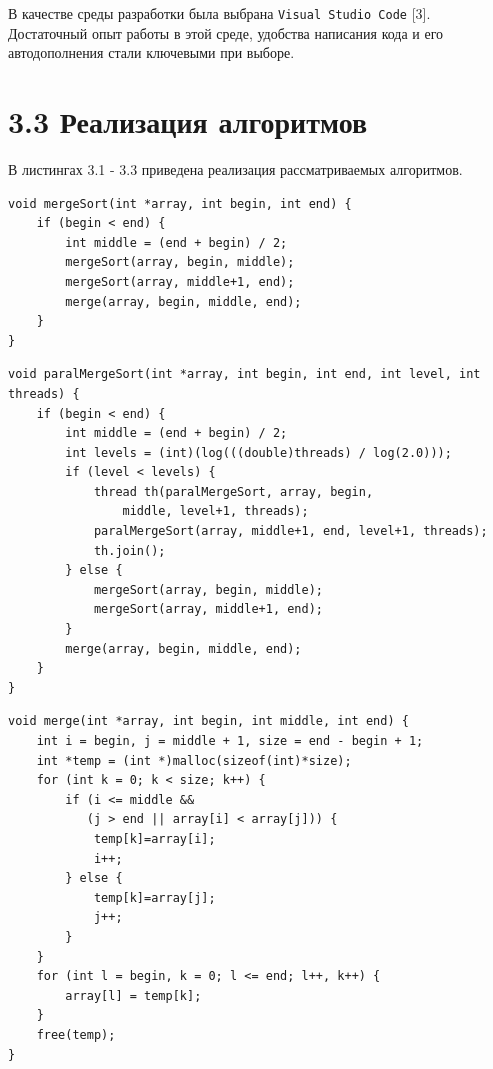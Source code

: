 \documentclass[12pt, a4paper]{report}
\begin{document}
В качестве среды разработки была выбрана \verb|Visual Studio Code| [3]. Достаточный опыт работы в этой среде, удобства написания кода и его автодополнения стали ключевыми при выборе.

\section*{3.3 Реализация алгоритмов}

В листингах 3.1 - 3.3 приведена реализация рассматриваемых алгоритмов.

\newpage
\begin{lstlisting}[title=Листинг 3.1~--- Стандартный алгоритм сортировки слиянием]
void mergeSort(int *array, int begin, int end) {
    if (begin < end) {
        int middle = (end + begin) / 2;
        mergeSort(array, begin, middle);
        mergeSort(array, middle+1, end);
        merge(array, begin, middle, end);
    }
}
\end{lstlisting}

\begin{lstlisting}[title=Листинг 3.2~--- Параллельная сортировка слиянием]
void paralMergeSort(int *array, int begin, int end, int level, int threads) {
    if (begin < end) {
        int middle = (end + begin) / 2;
        int levels = (int)(log(((double)threads) / log(2.0)));
        if (level < levels) {
            thread th(paralMergeSort, array, begin,
            	middle, level+1, threads);
            paralMergeSort(array, middle+1, end, level+1, threads);
            th.join();
        } else {
            mergeSort(array, begin, middle);
            mergeSort(array, middle+1, end);
        }
        merge(array, begin, middle, end);
    }
}
\end{lstlisting}

\newpage
\begin{lstlisting}[title=Листинг 3.3~--- Функция слияния двух отсортированных массивов]
void merge(int *array, int begin, int middle, int end) {
    int i = begin, j = middle + 1, size = end - begin + 1;
    int *temp = (int *)malloc(sizeof(int)*size);
    for (int k = 0; k < size; k++) {
        if (i <= middle &&
           (j > end || array[i] < array[j])) {
            temp[k]=array[i];
            i++;
        } else {
            temp[k]=array[j];
            j++;
        }
    }
    for (int l = begin, k = 0; l <= end; l++, k++) {
        array[l] = temp[k];
    }
    free(temp);
}
\end{lstlisting}
\end{document}
